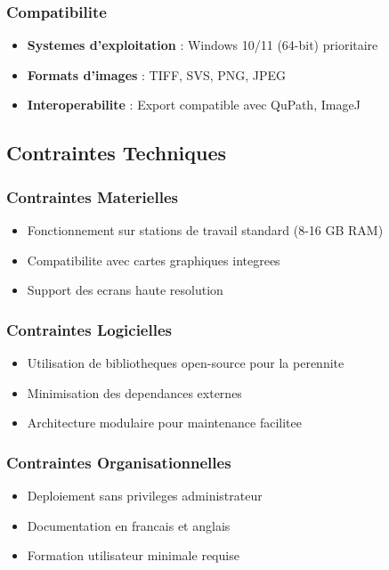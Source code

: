 \documentclass[12pt,a4paper]{article}
\begin{document}
\subsubsection{Compatibilite}

\begin{itemize}
\item \textbf{Systemes d'exploitation} : Windows 10/11 (64-bit) prioritaire
\item \textbf{Formats d'images} : TIFF, SVS, PNG, JPEG
\item \textbf{Interoperabilite} : Export compatible avec QuPath, ImageJ
\end{itemize}

\subsection{Contraintes Techniques}

\subsubsection{Contraintes Materielles}
\begin{itemize}
\item Fonctionnement sur stations de travail standard (8-16 GB RAM)
\item Compatibilite avec cartes graphiques integrees
\item Support des ecrans haute resolution
\end{itemize}

\subsubsection{Contraintes Logicielles}
\begin{itemize}
\item Utilisation de bibliotheques open-source pour la perennite
\item Minimisation des dependances externes
\item Architecture modulaire pour maintenance facilitee
\end{itemize}

\subsubsection{Contraintes Organisationnelles}
\begin{itemize}
\item Deploiement sans privileges administrateur
\item Documentation en francais et anglais
\item Formation utilisateur minimale requise
\end{itemize}
\end{document}
